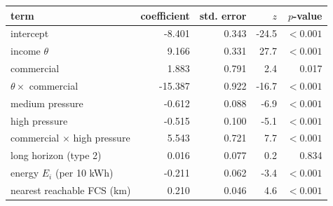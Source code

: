 \begin{tabular}{lrrrr}\toprule
term & coefficient & std. error & $z$ & $p$-value \\ \midrule
intercept & -8.401 & 0.343 & -24.5 & $<0.001$ \\
income $\theta$ & 9.166 & 0.331 & 27.7 & $<0.001$ \\
commercial & 1.883 & 0.791 & 2.4 & 0.017 \\
$\theta\times$ commercial & -15.387 & 0.922 & -16.7 & $<0.001$ \\
medium pressure & -0.612 & 0.088 & -6.9 & $<0.001$ \\
high pressure & -0.515 & 0.100 & -5.1 & $<0.001$ \\
commercial $\times$ high pressure & 5.543 & 0.721 & 7.7 & $<0.001$ \\
long horizon (type 2) & 0.016 & 0.077 & 0.2 & 0.834 \\
energy $E_i$ (per 10 kWh) & -0.211 & 0.062 & -3.4 & $<0.001$ \\
nearest reachable FCS (km) & 0.210 & 0.046 & 4.6 & $<0.001$ \\
\bottomrule\end{tabular}
